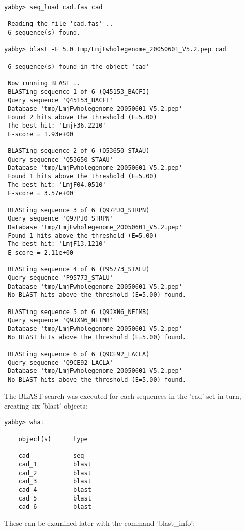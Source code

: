\begin{verbatim}
yabby> seq_load cad.fas cad

 Reading the file 'cad.fas' ..
 6 sequence(s) found.

yabby> blast -E 5.0 tmp/LmjFwholegenome_20050601_V5.2.pep cad

 6 sequence(s) found in the object 'cad'

 Now running BLAST ..
 BLASTing sequence 1 of 6 (Q45153_BACFI)
 Query sequence 'Q45153_BACFI'
 Database 'tmp/LmjFwholegenome_20050601_V5.2.pep'
 Found 2 hits above the threshold (E=5.00)
 The best hit: 'LmjF36.2210'
 E-score = 1.93e+00

 BLASTing sequence 2 of 6 (Q53650_STAAU)
 Query sequence 'Q53650_STAAU'
 Database 'tmp/LmjFwholegenome_20050601_V5.2.pep'
 Found 1 hits above the threshold (E=5.00)
 The best hit: 'LmjF04.0510'
 E-score = 3.57e+00

 BLASTing sequence 3 of 6 (Q97PJ0_STRPN)
 Query sequence 'Q97PJ0_STRPN'
 Database 'tmp/LmjFwholegenome_20050601_V5.2.pep'
 Found 1 hits above the threshold (E=5.00)
 The best hit: 'LmjF13.1210'
 E-score = 2.11e+00

 BLASTing sequence 4 of 6 (P95773_STALU)
 Query sequence 'P95773_STALU'
 Database 'tmp/LmjFwholegenome_20050601_V5.2.pep'
 No BLAST hits above the threshold (E=5.00) found.

 BLASTing sequence 5 of 6 (Q9JXN6_NEIMB)
 Query sequence 'Q9JXN6_NEIMB'
 Database 'tmp/LmjFwholegenome_20050601_V5.2.pep'
 No BLAST hits above the threshold (E=5.00) found.

 BLASTing sequence 6 of 6 (Q9CE92_LACLA)
 Query sequence 'Q9CE92_LACLA'
 Database 'tmp/LmjFwholegenome_20050601_V5.2.pep'
 No BLAST hits above the threshold (E=5.00) found.
\end{verbatim}

The BLAST search was executed for each sequences in the 'cad' set
in turn, creating six 'blast' objects: 

\begin{verbatim}
yabby> what

    object(s)      type
  ------------------------------
    cad            seq           
    cad_1          blast         
    cad_2          blast         
    cad_3          blast         
    cad_4          blast         
    cad_5          blast         
    cad_6          blast         
\end{verbatim}

These can be examined later with the command 'blast\_info':


